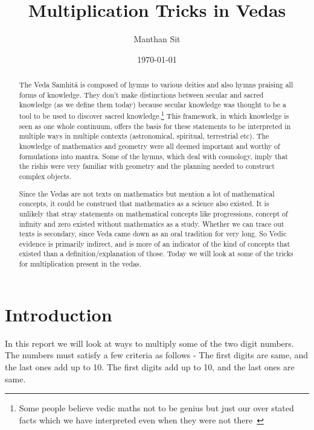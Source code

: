 \documentclass[12pt]{article}
\begin{document}
\title{\textbf{Multiplication Tricks in Vedas}}
\author{Manthan Sit}
\date{\small{\today}}
\maketitle



\begin{abstract}

The Veda Samhitâ is composed of hymns to various deities and also hymns praising all forms of knowledge. They don't make distinctions between secular and sacred knowledge (as we define them today) because secular knowledge was thought to be a tool to be used to discover sacred knowledge.\footnote{Some people believe vedic maths not to be genius but just our over stated facts which we have interpreted even when they were not there~\cite{fraud} } This framework, in which knowledge is seen as one whole continuum, offers the basis for these statements to be interpreted in multiple ways in multiple contexts (astronomical, spiritual, terrestrial etc). The knowledge of mathematics and geometry were all deemed important and worthy of formulations into mantra. Some of the hymns, which deal with cosmology, imply that the rishis were very familiar with geometry and the planning needed to construct complex objects.~\cite{wiki}

Since the Vedas are not texts on mathematics but mention a lot of mathematical concepts, it could be construed that mathematics as a science also existed. It is unlikely that stray statements on mathematical concepts like progressions, concept of infinity and zero existed without mathematics as a study. Whether we can trace out texts is secondary, since Veda came down as an oral tradition for very long. So Vedic evidence is primarily indirect, and is more of an indicator of the kind of concepts that existed than a definition/explanation of those. Today we will look at some of the tricks for multiplication present in the vedas.~\cite{vedic}

\end{abstract}

\vspace{10mm}

\section{Introduction}

In this report we will look at ways to multiply some of the two digit numbers. The numbers must satisfy a few criteria as follows -\newline
\textbullet  \hspace{5pt}The first digits are same, and the last ones add up to 10.\newline
\textbullet  \hspace{5pt}The first digits add up to 10, and the last ones are same.\newline
\end{document}
